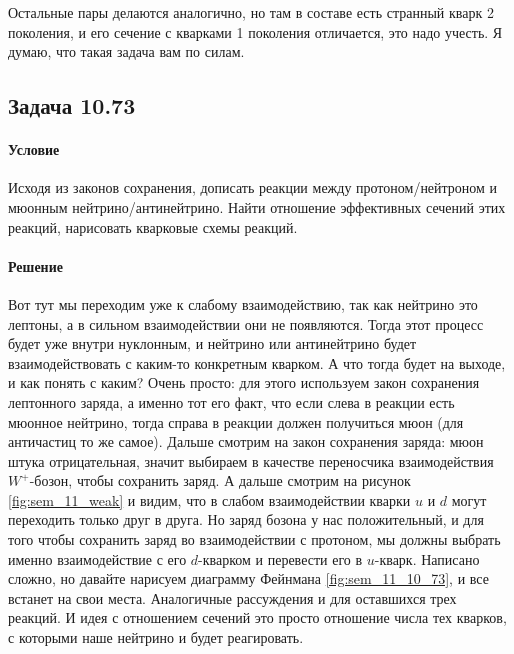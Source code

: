 \documentclass[12pt]{article}
\begin{document}
\noindent
Остальные пары делаются аналогично, но там в составе есть странный кварк 2 поколения, и его сечение с кварками 1 поколения отличается, это надо учесть. Я думаю, что такая задача вам по силам.

\subsection{Задача 10.73}
\label{task_10.73}
\paragraph{Условие}
Исходя из законов сохранения, дописать реакции между протоном/нейтроном и мюонным нейтрино/антинейтрино. Найти отношение эффективных сечений этих реакций, нарисовать кварковые схемы реакций.
\paragraph{Решение}
Вот тут мы переходим уже к слабому взаимодействию, так как нейтрино это лептоны, а в сильном взаимодействии они не появляются. Тогда этот процесс будет уже внутри нуклонным, и нейтрино или антинейтрино будет взаимодействовать с каким-то конкретным кварком. А что тогда будет на выходе, и как понять с каким? Очень просто: для этого используем закон сохранения лептонного заряда, а именно тот его факт, что если слева в реакции есть мюонное нейтрино, тогда справа в реакции должен получиться мюон (для античастиц то же самое). Дальше смотрим на закон сохранения заряда: мюон штука отрицательная, значит выбираем в качестве переносчика взаимодействия $W^+$-бозон, чтобы сохранить заряд. А дальше смотрим на рисунок \ref{fig:sem_11_weak} и видим, что в слабом взаимодействии кварки $u$ и $d$ могут переходить только друг в друга. Но заряд бозона у нас положительный, и для того чтобы сохранить заряд во взаимодействии с протоном, мы должны выбрать именно взаимодействие с его $d$-кварком и перевести его в $u$-кварк. Написано сложно, но давайте нарисуем диаграмму Фейнмана \ref{fig:sem_11_10_73}, и все встанет на свои места. Аналогичные рассуждения и для оставшихся трех реакций. И идея с отношением сечений это просто отношение числа тех кварков, с которыми наше нейтрино и будет реагировать.
\end{document}
